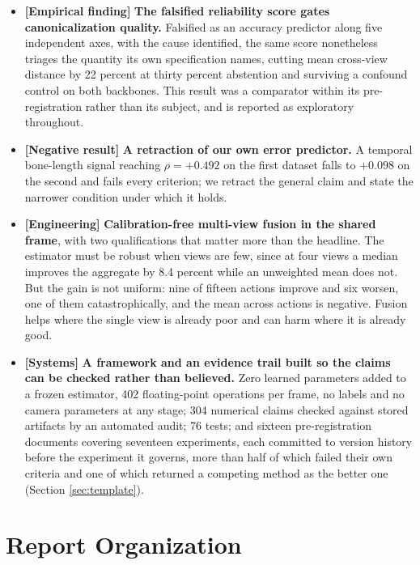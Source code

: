 \documentclass[12pt,a4paper]{report}
\begin{document}
\begin{itemize}
\item \textbf{[Empirical finding]} \textbf{The falsified reliability score gates canonicalization quality.} Falsified as an accuracy predictor along five independent axes, with the cause identified, the same score nonetheless triages the quantity its own specification names, cutting mean cross-view distance by 22 percent at thirty percent abstention and surviving a confound control on both backbones. This result was a comparator within its pre-registration rather than its subject, and is reported as exploratory throughout.

\item \textbf{[Negative result]} \textbf{A retraction of our own error predictor.} A temporal bone-length signal reaching $\rho = +0.492$ on the first dataset falls to $+0.098$ on the second and fails every criterion; we retract the general claim and state the narrower condition under which it holds.

\item \textbf{[Engineering]} \textbf{Calibration-free multi-view fusion in the shared frame}, with two qualifications that matter more than the headline. The estimator must be robust when views are few, since at four views a median improves the aggregate by 8.4 percent while an unweighted mean does not. But the gain is not uniform: nine of fifteen actions improve and six worsen, one of them catastrophically, and the mean across actions is negative. Fusion helps where the single view is already poor and can harm where it is already good.

\item \textbf{[Systems]} \textbf{A framework and an evidence trail built so the claims can be checked rather than believed.} Zero learned parameters added to a frozen estimator, 402 floating-point operations per frame, no labels and no camera parameters at any stage; 304 numerical claims checked against stored artifacts by an automated audit; 76 tests; and sixteen pre-registration documents covering seventeen experiments, each committed to version history before the experiment it governs, more than half of which failed their own criteria and one of which returned a competing method as the better one (Section \ref{sec:template}).
\end{itemize}

\section{Report Organization}
\end{document}
